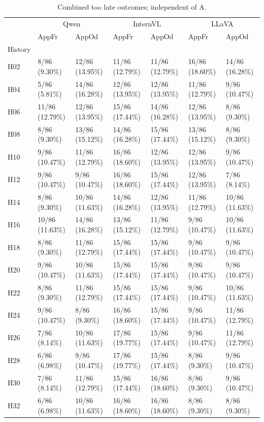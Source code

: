 \begin{table}[tbp]
\caption{Combined too late outcomes; independent of A.}
\label{tab:rq4-too-late-paper-table}
\begin{tabular}{lllllll}
\toprule
 & \multicolumn{2}{c}{Qwen} & \multicolumn{2}{c}{InternVL} & \multicolumn{2}{c}{LLaVA} \\
 & AppFr & AppOd & AppFr & AppOd & AppFr & AppOd \\
History &  &  &  &  &  &  \\
\midrule
H02 & 8/86 (9.30\%) & 12/86 (13.95\%) & 11/86 (12.79\%) & 11/86 (12.79\%) & 16/86 (18.60\%) & 14/86 (16.28\%) \\
H04 & 5/86 (5.81\%) & 14/86 (16.28\%) & 12/86 (13.95\%) & 12/86 (13.95\%) & 11/86 (12.79\%) & 9/86 (10.47\%) \\
H06 & 11/86 (12.79\%) & 12/86 (13.95\%) & 15/86 (17.44\%) & 14/86 (16.28\%) & 12/86 (13.95\%) & 8/86 (9.30\%) \\
H08 & 8/86 (9.30\%) & 13/86 (15.12\%) & 14/86 (16.28\%) & 15/86 (17.44\%) & 13/86 (15.12\%) & 8/86 (9.30\%) \\
H10 & 9/86 (10.47\%) & 11/86 (12.79\%) & 16/86 (18.60\%) & 12/86 (13.95\%) & 12/86 (13.95\%) & 9/86 (10.47\%) \\
H12 & 9/86 (10.47\%) & 9/86 (10.47\%) & 16/86 (18.60\%) & 15/86 (17.44\%) & 12/86 (13.95\%) & 7/86 (8.14\%) \\
H14 & 8/86 (9.30\%) & 10/86 (11.63\%) & 14/86 (16.28\%) & 12/86 (13.95\%) & 11/86 (12.79\%) & 10/86 (11.63\%) \\
H16 & 10/86 (11.63\%) & 14/86 (16.28\%) & 13/86 (15.12\%) & 11/86 (12.79\%) & 9/86 (10.47\%) & 10/86 (11.63\%) \\
H18 & 8/86 (9.30\%) & 11/86 (12.79\%) & 15/86 (17.44\%) & 15/86 (17.44\%) & 9/86 (10.47\%) & 9/86 (10.47\%) \\
H20 & 9/86 (10.47\%) & 10/86 (11.63\%) & 15/86 (17.44\%) & 15/86 (17.44\%) & 9/86 (10.47\%) & 9/86 (10.47\%) \\
H22 & 8/86 (9.30\%) & 11/86 (12.79\%) & 15/86 (17.44\%) & 15/86 (17.44\%) & 9/86 (10.47\%) & 10/86 (11.63\%) \\
H24 & 9/86 (10.47\%) & 8/86 (9.30\%) & 16/86 (18.60\%) & 15/86 (17.44\%) & 9/86 (10.47\%) & 11/86 (12.79\%) \\
H26 & 7/86 (8.14\%) & 10/86 (11.63\%) & 17/86 (19.77\%) & 15/86 (17.44\%) & 9/86 (10.47\%) & 11/86 (12.79\%) \\
H28 & 6/86 (6.98\%) & 9/86 (10.47\%) & 17/86 (19.77\%) & 15/86 (17.44\%) & 8/86 (9.30\%) & 9/86 (10.47\%) \\
H30 & 7/86 (8.14\%) & 11/86 (12.79\%) & 15/86 (17.44\%) & 16/86 (18.60\%) & 8/86 (9.30\%) & 9/86 (10.47\%) \\
H32 & 6/86 (6.98\%) & 10/86 (11.63\%) & 16/86 (18.60\%) & 16/86 (18.60\%) & 8/86 (9.30\%) & 8/86 (9.30\%) \\
\bottomrule
\end{tabular}
\end{table}
